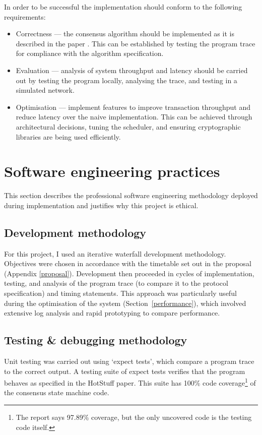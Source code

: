 In order to be successful the implementation should conform to the following requirements:
\begin{itemize}
	\item Correctness --- the consensus algorithm should be implemented as it is described in the paper \cite{yinHotStuffBFTConsensus2019}. This can be established by testing the program trace for compliance with the algorithm specification.
	\item Evaluation --- analysis of system throughput and latency should be carried out by testing the program locally, analysing the trace, and testing in a simulated network.
	\item Optimisation --- implement features to improve transaction throughput and reduce latency over the naive implementation. This can be achieved through architectural decisions, tuning the scheduler, and ensuring cryptographic libraries are being used efficiently.
\end{itemize}

\section{Software engineering practices} \label{softwareeng}

This section describes the professional software engineering methodology deployed during implementation and justifies why this project is ethical.

\subsection{Development methodology} \label{devmethods}

For this project, I used an iterative waterfall development methodology. Objectives were chosen in accordance with the timetable set out in the proposal (Appendix \ref{proposal}). Development then proceeded in cycles of implementation, testing, and analysis of the program trace (to compare it to the protocol specification) and timing statements. This approach was particularly useful during the optimisation of the system (Section~\ref{performance}), which involved extensive log analysis and rapid prototyping to compare performance.

\subsection{Testing \& debugging methodology} \label{testing}

Unit testing was carried out using `expect tests', which compare a program trace to the correct output. A testing suite of expect tests verifies that the program behaves as specified in the HotStuff paper. This suite has 100\% code coverage\footnote{The report says 97.89\% coverage, but the only uncovered code is the testing code itself.} of the consensus state machine code.%

